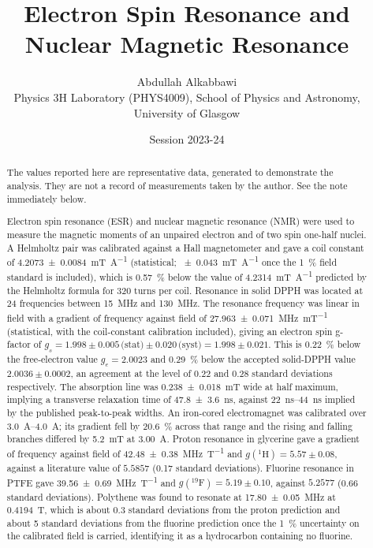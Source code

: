 \documentclass[11pt,a4paper]{article}
\title{\vspace{-1.2cm}\textbf{Electron Spin Resonance and Nuclear Magnetic Resonance}}
\author{Abdullah Alkabbawi\\[2pt]
\normalsize Physics 3H Laboratory (PHYS4009), School of Physics and Astronomy,\\
\normalsize University of Glasgow}
\date{\normalsize Session 2023-24}
\begin{document}
\maketitle
\thispagestyle{fancy}

\begin{abstract}
\noindent
The values reported here are representative data, generated to demonstrate the analysis. They are
not a record of measurements taken by the author. See the note immediately below.

\smallskip\noindent
Electron spin resonance (ESR) and nuclear magnetic resonance (NMR) were used to measure the
magnetic moments of an unpaired electron and of two spin one-half nuclei. A Helmholtz pair was
calibrated against a Hall magnetometer and gave a coil constant of
\SI{4.2073 \pm 0.0084}{\milli\tesla\per\ampere} (statistical;
\SI{\pm 0.043}{\milli\tesla\per\ampere} once the \SI{1}{\percent} field standard is included),
which is \SI{0.57}{\percent} below the value of
\SI{4.2314}{\milli\tesla\per\ampere} predicted by the Helmholtz formula for 320 turns per coil.
Resonance in solid DPPH was located at 24 frequencies between \SI{15}{\mega\hertz} and
\SI{130}{\mega\hertz}. The resonance frequency was linear in field with a gradient of frequency
against field of \SI{27.963 \pm 0.071}{\mega\hertz\per\milli\tesla} (statistical, with the
coil-constant calibration included), giving an electron spin g-factor of
$g_s = 1.998 \pm 0.005\,\text{(stat)} \pm 0.020\,\text{(syst)} = 1.998 \pm 0.021$. This is
\SI{0.22}{\percent} below the free-electron value $g_e = 2.0023$ and \SI{0.29}{\percent} below the
accepted solid-DPPH value $2.0036 \pm 0.0002$, an agreement at the level of 0.22 and 0.28
standard deviations respectively. The absorption line was
\SI{0.238 \pm 0.018}{\milli\tesla} wide at half
maximum, implying a transverse relaxation time of \SI{47.8 \pm 3.6}{\nano\second}, against
\SIrange{22}{44}{\nano\second} implied by the published peak-to-peak widths. An iron-cored
electromagnet was calibrated over
\SIrange{3.0}{4.0}{\ampere}; its gradient fell by \SI{20.6}{\percent} across that range and the
rising and falling branches differed by \SI{5.2}{\milli\tesla} at \SI{3.00}{\ampere}. Proton
resonance in glycerine gave a gradient of frequency against field of
\SI{42.48 \pm 0.38}{\mega\hertz\per\tesla} and $g(^{1}\mathrm{H}) = 5.57 \pm 0.08$, against a
literature value of $5.5857$ (0.17 standard deviations). Fluorine resonance in PTFE gave
\SI{39.56 \pm 0.69}{\mega\hertz\per\tesla} and $g(^{19}\mathrm{F}) = 5.19 \pm 0.10$, against
$5.2577$ (0.66 standard deviations). Polythene was found to resonate at
\SI{17.80 \pm 0.05}{\mega\hertz} at
\SI{0.4194}{\tesla}, which is about 0.3 standard deviations from the proton prediction and about
5 standard deviations from the
fluorine prediction once the \SI{1}{\percent} uncertainty on the calibrated field is carried,
identifying it as a hydrocarbon containing no fluorine.
\end{abstract}
\end{document}
